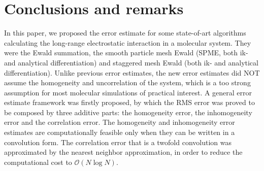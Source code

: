 \documentclass[aps,pre,preprint]{revtex4}
\begin{document}

\section{Conclusions and remarks}
\label{sec:conclusions}

In this paper, we proposed the error estimate for some state-of-art
algorithms calculating the long-range electrostatic interaction in a
molecular system. They were the Ewald summation, the smooth particle
mesh Ewald (SPME, both ik- and analytical differentiation) and
staggered mesh Ewald (both ik- and analytical differentiation).
Unlike previous error estimates, the new error estimates did NOT
assume the homogeneity and uncorrelation of the system, which is a too
strong assumption for most molecular simulations of practical
interest.  A general error estimate framework was firstly proposed, by
which the RMS error was proved to be composed by three additive parts:
the homogeneity error, the inhomogeneity error and the correlation
error.  The homogeneity and inhomogeneity error estimates are
computationally feasible 
only when they can be written in a
convolution form.  The correlation error that is a twofold
convolution was approximated by the nearest neighbor approximation, in
order to reduce the computational cost to $\mathcal O(N\log N)$.
\end{document}
